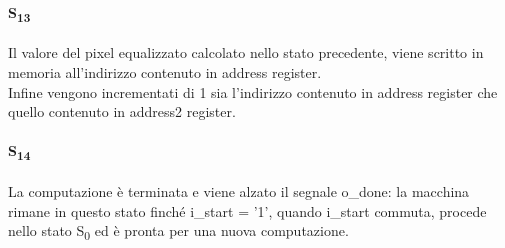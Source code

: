 \paragraph{S\textsubscript{13}}
Il valore del pixel equalizzato calcolato nello stato precedente, viene scritto in memoria all'indirizzo contenuto in address register.\\
Infine vengono incrementati di 1 sia l'indirizzo contenuto in address register che quello contenuto in address2 register.
\paragraph{S\textsubscript{14}}
La computazione è terminata e viene alzato il segnale o\_done: la macchina rimane in questo stato finché i\_start = '1', quando i\_start commuta, procede nello stato S\textsubscript{0} ed è pronta per una nuova computazione.

